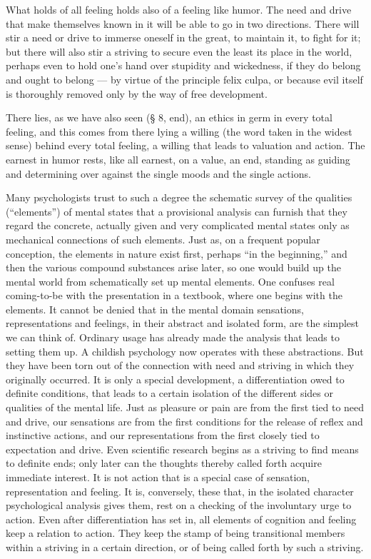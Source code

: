 \documentclass[12pt]{book}
\newcommand{\opage}[1]{\marginnote{\footnotesize\textit{[#1]}}}
\begin{document}
What holds of all feeling holds also of a feeling like humor. The need and drive that make
themselves known in it will be able to go in two directions. There will stir a need or drive
to immerse oneself in the great, to maintain it, to fight for it; but there will also stir
a striving to secure even the least its place in the world, perhaps even to hold one's hand
over stupidity and wickedness, if they do belong and ought to belong --- by virtue of the
principle felix culpa, or because evil itself is thoroughly removed only by the way of free
development.

There lies, as we have also seen (§ 8, end), an ethics in germ in every total feeling, and
this comes from there lying \opage{125}a willing (the word taken in the widest sense) behind
every total feeling, a willing that leads to valuation and action. The earnest in humor
rests, like all earnest, on a value, an end, standing as guiding and determining over against
the single moods and the single actions.

Many psychologists trust to such a degree the schematic survey of the qualities
(``elements'') of mental states that a provisional analysis can furnish that they regard the
concrete, actually given and very complicated mental states only as mechanical connections
of such elements. Just as, on a frequent popular conception, the elements in nature exist
first, perhaps ``in the beginning,'' and then the various compound substances arise later,
so one would build up the mental world from schematically set up mental elements. One
confuses real coming-to-be with the presentation in a textbook, where one begins with the
elements. It cannot be denied that in the mental domain sensations, representations and
feelings, in their abstract and isolated form, are the simplest we can think of. Ordinary
usage has already made the analysis that leads to setting them up. A childish psychology now
operates with these abstractions. But they have been torn out of the connection with need and
striving in which they originally occurred. It is only a special development, a
differentiation owed to definite conditions, that leads to a certain isolation of the
different sides or qualities of the mental life. Just as pleasure or pain are from the first
tied to need and drive, our sensations are from the first conditions for the release of
reflex and instinctive actions, and our representations from the first closely tied to
expectation and drive. Even scientific research begins as a striving to find means to
definite ends; only later can the thoughts thereby called forth acquire immediate interest.
It is not action that is a special case of sensation, representation and feeling. It is,
conversely, these that, in the isolated character psychological analysis gives them, rest on
a checking of the involuntary urge to action. Even after differentiation has set in, all
elements of cognition and feeling keep a relation to action. They keep the stamp
\opage{126}of being transitional members within a striving in a certain direction, or of
being called forth by such a striving.
\end{document}
